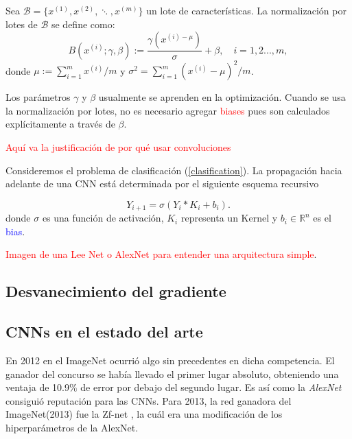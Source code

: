 \begin{definition}
    Sea $\mathcal{B} = \{x^{(1)}, x^{(2)}, \ddots, x^{(m)}\}$ un lote de características. La normalización por lotes de $\mathcal B$ se define como:
    \begin{equation}
        B(x^{(i)}; \gamma, \beta) := \frac{\gamma(x^{(i) - \mu})}{\sigma} + \beta, \quad i=1,2...,m,
    \end{equation}
    donde  $\mu := \sum^m_{i=1}x^{(i)}/m$ y $\sigma^2 = \sum^m_{i=1}(x^{(i)}-\mu)^2/m$.
\end{definition}
Los parámetros $\gamma$ y $\beta$ usualmente se aprenden en la optimización. Cuando se usa la normalización por lotes, no es necesario agregar \textcolor{red}{biases} pues son calculados explícitamente a través de $\beta$.

\textcolor{red}{Aquí va la justificación de por qué usar convoluciones}   
\begin{definition} 
    Consideremos el problema de clasificación (\ref{clasification}). La propagación hacia adelante de una CNN está determinada por el siguiente esquema recursivo

    \begin{equation}
        Y_{i+1} = \sigma(Y_i * K_i + b_i).
    \end{equation}
    donde $\sigma$ es una función de activación, $K_i$ representa un Kernel y $b_i\in \mathbb R^n$ es el \textcolor{blue}{bias}.
\end{definition}

\textcolor{red}{Imagen de una Lee Net o AlexNet para entender una arquitectura simple}.


\subsection{Desvanecimiento del gradiente}

\subsection{CNNs en el estado del arte}
En 2012 en el ImageNet ocurrió algo sin precedentes en dicha competencia. El ganador del concurso se había llevado el primer lugar absoluto, obteniendo una ventaja de 10.9$\%$ de error por debajo del segundo lugar. Es así como la \textsl{AlexNet} \cite{alexnet} consiguió reputación para las CNNs. Para 2013, la red ganadora del ImageNet(2013) fue la Zf-net \cite{zfnet}, la cuál era una modificación de los hiperparámetros de la AlexNet.

